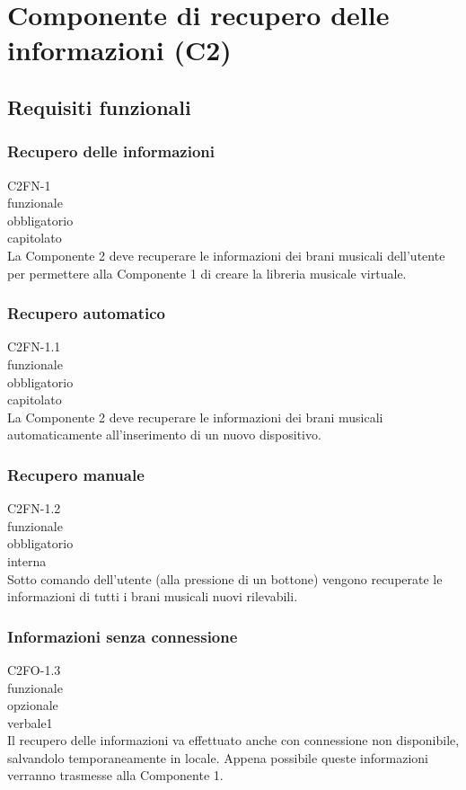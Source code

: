 \newpage


\section{Componente di recupero delle informazioni (C2)}

\subsection{Requisiti funzionali}
\subsubsection*{Recupero delle informazioni}
 C2FN-1 \\
 funzionale \\
 obbligatorio \\
 capitolato \\
La Componente 2 deve recuperare le informazioni dei brani musicali dell'utente
per permettere alla Componente 1 di creare la libreria musicale virtuale.

\subsubsection*{Recupero automatico}
 C2FN-1.1 \\
 funzionale \\
 obbligatorio \\
 capitolato \\
La Componente 2 deve recuperare le informazioni dei brani musicali
automaticamente all'inserimento di un nuovo dispositivo.

\subsubsection*{Recupero manuale}
 C2FN-1.2 \\
 funzionale \\
 obbligatorio \\
 interna \\
Sotto comando dell'utente (alla pressione di un bottone) vengono recuperate le
informazioni di tutti i brani musicali nuovi rilevabili.

\subsubsection*{Informazioni senza connessione}
 C2FO-1.3 \\
 funzionale \\
 opzionale \\
 verbale1 \\
Il recupero delle informazioni va effettuato anche con connessione non
disponibile, salvandolo temporaneamente in locale. Appena possibile queste
informazioni verranno trasmesse alla Componente 1.

